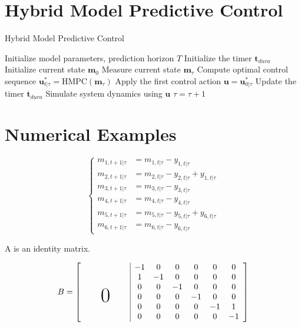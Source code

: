 \documentclass[english]{cccconf}
\begin{document}
\section{Hybrid Model Predictive Control}

\begin{algorithm}
\caption{Hybrid Model Predictive Control}
\label{alg:mpc}
\begin{algorithmic}[1]
\STATE Initialize model parameters, prediction horizon $T$
\STATE Initialize the timer $\mathbf{t}_{dura}$
\STATE Initialize current state $\mathbf{m}_0$
    \STATE Measure current state $\mathbf{m}_{\tau}$
    \STATE Compute optimal control sequence $\mathbf{u}_{t|\tau}^* = \text{HMPC}(\mathbf{m}_{\tau})$
    \STATE Apply the first control action $\mathbf{u} = \mathbf{u}_{0|\tau}^*$
    \STATE Update the timer $\mathbf{t}_{dura}$ 
    \STATE Simulate system dynamics using $\mathbf{u}$ 
    \STATE $\tau = \tau + 1$
\ENDWHILE
\end{algorithmic}
\end{algorithm}


\section{Numerical Examples}

\begin{equation}
\left\{
\begin{aligned}
m_{1,t+1|\tau} &= m_{1, t|\tau}-y_{1, t|\tau}\\
m_{2,t+1|\tau} &= m_{2, t|\tau} - y_{2, t|\tau} +y_{1, t|\tau}\\
m_{3,t+1|\tau} &= m_{3, t|\tau} - y_{3, t|\tau}\\
m_{4,t+1|\tau} &= m_{4, t|\tau} - y_{4, t|\tau}\\
m_{5,t+1|\tau} &= m_{5, t|\tau} - y_{5, t|\tau} +y_{6, t|\tau}\\
m_{6,t+1|\tau} &= m_{6, t|\tau} -y_{6, t|\tau}
\end{aligned}
\right.
\end{equation}

A is an identity matrix.

\begin{equation}
B = 
\left[\begin{array}{cccccc|cccccc}
  & & & & & & -1 & 0 & 0 & 0 & 0 & 0 \\
  & & & & & & 1 & -1 & 0 & 0 & 0 & 0 \\
  & & & & & & 0 & 0 & -1 & 0 & 0 & 0 \\
  & & & & & & 0 & 0 & 0 & -1 & 0 & 0 \\
  \multicolumn{6}{c|}{\raisebox{2ex}[0pt]{\Huge0}} & 0 & 0 & 0 & 0 & -1 & 1 \\
  & & & & & & 0 & 0 & 0 & 0 & 0 & -1 \\
\end{array}\right]
\end{equation}
\end{document}
